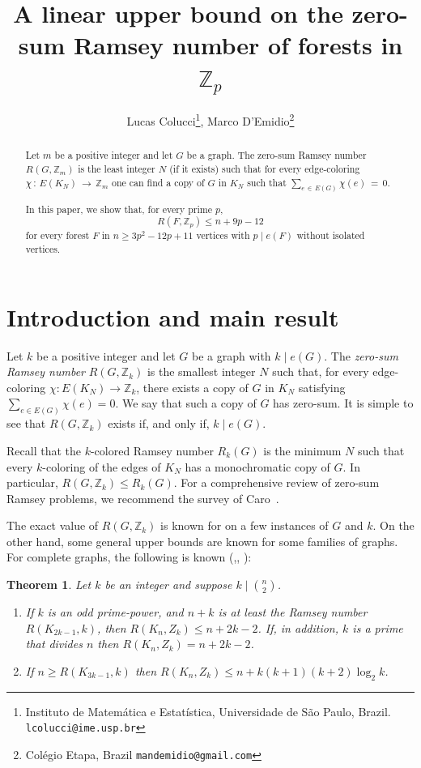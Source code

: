 \documentclass{article}
\title{A linear upper bound on the zero-sum Ramsey number of forests in $\mathbb{Z}_p$}
\author{
    Lucas Colucci\thanks{Instituto de Matemática e Estatística, Universidade de São Paulo, Brazil. \texttt{lcolucci@ime.usp.br}}, 
    Marco D'Emidio\thanks{Colégio Etapa, Brazil \texttt{mandemidio@gmail.com}}
}
\numberwithin{table}{section}
\newtheorem{theorem}{Theorem}
\newcommand{\Z}{\mathbb{Z}}
\begin{document}
\maketitle



\begin{abstract}
 Let $m$ be a positive integer and let $G$ be a graph. The zero-sum Ramsey number $R(G,\Z_m)$ is the least integer $N$ (if it exists) such that for every edge-coloring {$\chi \, : \, E(K_N) \, \rightarrow \, \Z_m$} one can find a copy of $G$ in $K_N$ such that $\sum_{e \, \in \, E(G)}{\chi(e)} \, = \, 0$. 
 
In this paper, we show that, for every prime $p$,
$$R(F,\mathbb{Z}_p)\leq n+9p-12$$
for every forest $F$ in $n\geq 3p^2-12p+11$ vertices with $p\mid e(F)$ without isolated vertices.
\end{abstract}

\section{Introduction and main result} \label{sec : intro}



Let $k$ be a positive integer and let $G$ be a graph with $k\mid e(G)$. The \emph{zero-sum Ramsey number} $R(G, \mathbb{Z}_k)$ is the smallest integer $N$ such that, for every edge-coloring $\chi: E(K_N) \to \mathbb{Z}_k$, there exists a copy of $G$ in $K_N$ satisfying $\sum_{e \in E(G)} \chi(e) = 0$. We say that such a copy of $G$ has zero-sum. It is simple to see that $R(G, \mathbb{Z}_k)$ exists if, and only if, $k \mid e(G)$.

\medskip

Recall that the $k$-colored Ramsey number $R_k(G)$ is the minimum $N$ such that every $k$-coloring of the edges of $K_N$ has a monochromatic copy of $G$. In particular, $R(G, \Z_k) \leq R_{k}(G)$. For a comprehensive review of zero-sum Ramsey problems, we recommend the survey of Caro~\cite{caro1994complete}. 

\medskip

The exact value of $R(G,\mathbb{Z}_k)$ is known for on a few instances of $G$ and $k$. On the other hand, some general upper bounds are known for some families of graphs. For complete graphs, the following is known (\cite{alon1993three},\cite{caro1992zero}, \cite{caro1994linear}):

\begin{theorem}\label{thm:uppercomplete}
    Let $k$ be an integer and suppose $k \mid \binom{n}{2}$.

\begin{enumerate}
    \item[(i)] \textit{If $k$ is an odd prime-power, and $n+k$ is at least the Ramsey number $R(K_{2k-1}, k)$, then $R(K_n, Z_k) \leq n + 2k - 2$. If, in addition, $k$ is a prime that divides $n$ then $R(K_n, Z_k) = n + 2k - 2$.}
    \item[(ii)] \textit{If $n \geq R(K_{3k-1}, k)$ then $R(K_n, Z_k) \leq n + k(k+1)(k+2) \log_2 k$.}
\end{enumerate}
\end{theorem}
\end{document}

